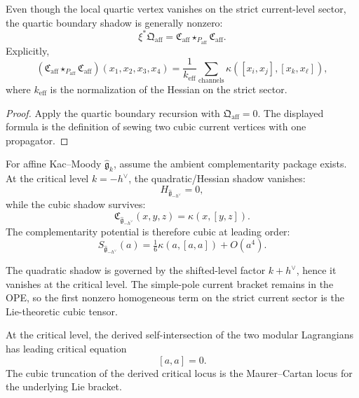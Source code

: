 \begin{corollary}
\label{cor:nms-affine-boundary-tree}
Even though the local quartic vertex vanishes on the strict current-level sector, the quartic boundary shadow is generally nonzero:
\[
\xi^*\mathfrak Q_{\mathrm{aff}}=\mathfrak C_{\mathrm{aff}}\star_{P_{\mathrm{aff}}}\mathfrak C_{\mathrm{aff}}.
\]
Explicitly,
\[
(\mathfrak C_{\mathrm{aff}}\star_{P_{\mathrm{aff}}}\mathfrak C_{\mathrm{aff}})(x_1,x_2,x_3,x_4)
=
\frac{1}{k_{\mathrm{eff}}}
\sum_{\mathrm{channels}}
\kappa([x_i,x_j],[x_k,x_\ell]),
\]
where $k_{\mathrm{eff}}$ is the normalization of the Hessian on the strict sector.
\end{corollary}

\begin{proof}
Apply the quartic boundary recursion with $\mathfrak Q_{\mathrm{aff}}=0$. The displayed formula is the definition of sewing two cubic current vertices with one propagator.\qedhere
\end{proof}

\begin{conjecture}
\label{conj:nms-critical-level-emergence}
For affine Kac--Moody $\widehat{\mathfrak{g}}_k$, assume the ambient complementarity package exists. At the critical level $k = -h^\vee$, the quadratic/Hessian shadow vanishes:
\[
H_{\widehat{\mathfrak{g}}_{-h^\vee}} = 0,
\]
while the cubic shadow survives:
\[
\mathfrak C_{\widehat{\mathfrak{g}}_{-h^\vee}}(x,y,z) = \kappa(x,[y,z]).
\]
The complementarity potential is therefore cubic at leading order:
\[
S_{\widehat{\mathfrak{g}}_{-h^\vee}}(a) = \tfrac16\kappa(a,[a,a]) + O(a^4).
\]
\end{conjecture}

\begin{remark}
The quadratic shadow is governed by the shifted-level factor
$k+h^\vee$, hence it vanishes at the critical level. The simple-pole
current bracket remains in the OPE, so the first nonzero homogeneous
term on the strict current sector is the Lie-theoretic cubic tensor.
\end{remark}

\begin{conjecture}
\label{conj:nms-critical-mc}
At the critical level, the derived self-intersection of the two modular Lagrangians has leading critical equation
\[
[a,a] = 0.
\]
The cubic truncation of the derived critical locus is the Maurer--Cartan locus for the underlying Lie bracket.
\end{conjecture}

